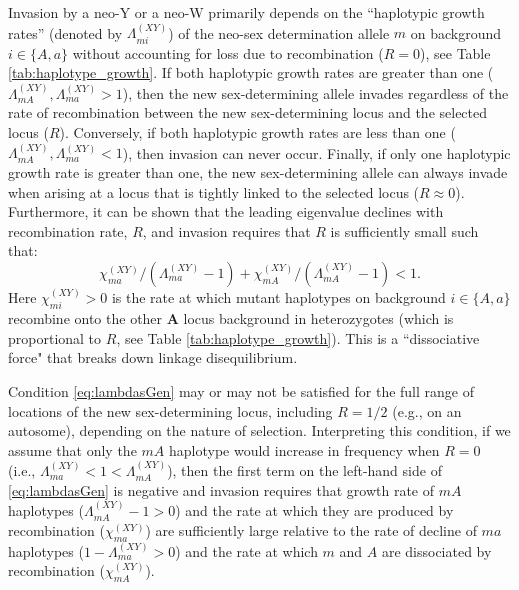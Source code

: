 \documentclass[10pt,letterpaper]{article}
\providecommand{\DIFadd}[1]{{\protect\color{blue}\uwave{#1}}} %
\providecommand{\DIFaddbegin}{} %
\providecommand{\DIFaddend}{} %
\begin{document}
Invasion by a neo-Y or a neo-W primarily depends on the ``haplotypic growth rates'' (denoted by $\Lambda_{mi}^{(XY)}$) of the neo-sex determination allele $m$ on background $i\in\{A,a\}$ without accounting for loss due to recombination ($R=0$), see Table \ref{tab:haplotype_growth}.
If both haplotypic growth rates are greater than one ($\Lambda_{mA}^{(XY)}, \Lambda_{ma}^{(XY)}>1$), then the new sex-determining allele invades regardless of the rate of recombination between the new sex-determining locus and the selected locus ($R$).
Conversely, if both haplotypic growth rates are less than one ($\Lambda_{mA}^{(XY)}, \Lambda_{ma}^{(XY)}<1$), then invasion can never occur.  
Finally, if only one haplotypic growth rate is greater than one, the new sex-determining allele can always invade when arising at a locus that is tightly linked to the selected locus ($R\approx0$).  
Furthermore, it can be shown that the leading eigenvalue declines with recombination rate, $R$, and invasion requires that $R$ is sufficiently small such that: 
\begin{equation}\label{eq:lambdasGen}
\chi_{ma}^{(XY)}/\left(\Lambda_{ma}^{(XY)} - 1\right) + \chi_{mA}^{(XY)}/\left(\Lambda_{mA}^{(XY)} - 1\right) < 1.
\end{equation}
\noindent 
Here $\chi_{mi}^{(XY)}>0$ is the rate at which mutant haplotypes on background $i\in\{A,a\}$ recombine onto the other $\mathbf{A}$ locus background in heterozygotes (which is proportional to $R$,  see Table \ref{tab:haplotype_growth}).
This is a ``dissociative force" that breaks down linkage disequilibrium.

Condition \ref{eq:lambdasGen} may or may not be satisfied for the full range of locations of the new sex-determining locus, including $R=1/2$ (e.g., on an autosome), depending on the nature of selection.  
Interpreting this condition, if we assume that only the $mA$ haplotype would increase in frequency when $R=0$ (i.e., $\Lambda_{ma}^{(XY)}<1<\Lambda_{mA}^{(XY)}$), then the first term on the left-hand side of \DIFaddbegin \DIFadd{Eq }\DIFaddend \eqref{eq:lambdasGen} is negative and invasion requires that growth rate of $mA$ haplotypes ($\Lambda_{mA}^{(XY)}-1>0$) and the rate at which they are produced by recombination ($\chi_{ma}^{(XY)}$) are sufficiently large relative to the rate of decline of $ma$ haplotypes ($1-\Lambda_{ma}^{(XY)}>0$) and the rate at which $m$ and $A$ are dissociated by recombination ($\chi_{mA}^{(XY)}$).
\end{document}
